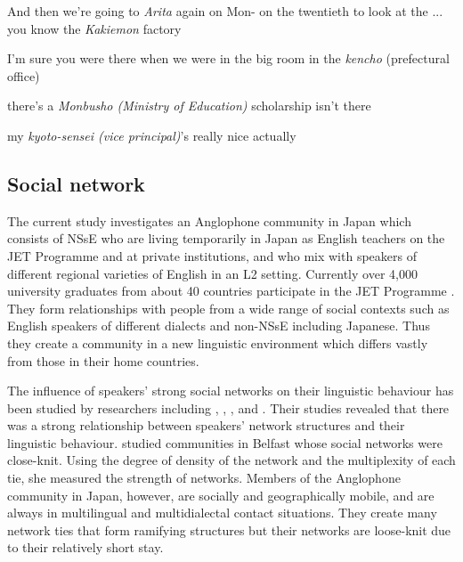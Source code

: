 \documentclass[output=paper]{LSP/langsci}
\begin{document}
\begin{exe}
\label{ex:4}
\ex And then we're going to \textit{Arita} again on Mon- on the twentieth to look at the ... you know the \textit{Kakiemon} factory
\end{exe}

\begin{exe}
\label{ex:5}
\ex I’m sure you were there when we were in the big room in the \textit{kencho} (prefectural office)
\end{exe}

\begin{exe}
\label{ex:6}
\ex there's a \textit{Monbusho (Ministry of Education)} scholarship isn't there
\end{exe}

\begin{exe}
\label{ex:7}
\ex my \textit{kyoto-sensei (vice principal)}'s really nice actually
\end{exe}

\subsection{Social network}
The current study investigates an Anglophone community in Japan which consists of NSsE who are living temporarily in Japan as English teachers on the JET Programme and at private institutions, and who mix with speakers of different regional varieties of English in an L2 setting. Currently over 4,000 university graduates from about 40 countries participate in the JET Programme \citep{council_of_local_authorities_for_international_relations_[clair]_jet_2013}. They form relationships with people from a wide range of social contexts such as English speakers of different dialects and non-NSsE including Japanese. Thus they create a community in a new linguistic environment which differs vastly from those in their home countries.

The influence of speakers’ strong social networks on their linguistic behaviour has been studied by researchers including \citet{cheshire_variation_1982}, \citet{eckert_adolescent_1988}, \citet{hirano_dialect_2013}, \citet{labov_language_1972} and \citet{milroy_language_1987}. Their studies revealed that there was a strong relationship between speakers’ network structures and their linguistic behaviour. \citet{milroy_language_1987} studied communities in Belfast whose social networks were close-knit. Using the degree of density of the network and the multiplexity of each tie, she measured the strength of networks. Members of the Anglophone community in Japan, however, are socially and geographically mobile, and are always in multilingual and multidialectal contact situations. They create many network ties that form ramifying structures but their networks are loose-knit due to their relatively short stay.
\end{document}
